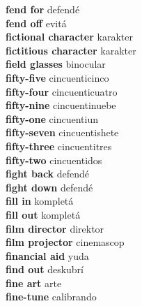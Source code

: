 \textbf{ fend for  } defendé \\
\textbf{ fend off  } evitá \\
\textbf{ fictional character  } karakter \\
\textbf{ fictitious character  } karakter \\
\textbf{ field glasses  } binocular \\
\textbf{ fifty-five  } cincuenticinco \\
\textbf{ fifty-four  } cincuenticuatro \\
\textbf{ fifty-nine  } cincuentinuebe \\
\textbf{ fifty-one  } cincuentiun \\
\textbf{ fifty-seven  } cincuentishete \\
\textbf{ fifty-three  } cincuentitres \\
\textbf{ fifty-two  } cincuentidos \\
\textbf{ fight back  } defendé \\
\textbf{ fight down  } defendé \\
\textbf{ fill in  } kompletá \\
\textbf{ fill out  } kompletá \\
\textbf{ film director  } direktor \\
\textbf{ film projector  } cinemascop \\
\textbf{ financial aid  } yuda \\
\textbf{ find out  } deskubrí \\
\textbf{ fine art  } arte \\
\textbf{ fine-tune  } calibrando \\
